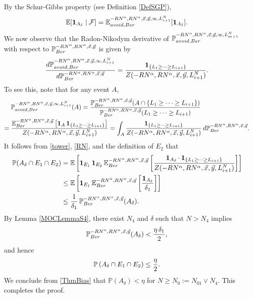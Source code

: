 	By the Schur-Gibbs property (see Definition \ref{DefSGP}),
	\[
	\mathbb{E}[\operatorname{\mathbf{1}}_{A_\delta}\mid \mathcal{F}]=\mathbb{E}_{avoid,Ber}^{-RN^\alpha,RN^\alpha,\vec x, \vec y, \infty, L_{i+1}^N}[\operatorname{\mathbf{1}}_{A_\delta}].
	\]
	We now observe that the Radon-Nikodym derivative of $\mathbb{P}_{avoid,Ber}^{-RN^\alpha,RN^\alpha,\vec x, \vec y, \infty, L_{m+1}^N}$ with respect to $\mathbb{P}_{Ber}^{-RN^\alpha, RN^\alpha,\vec x,\vec y}$ is given by 
	\begin{equation}
	\frac{d\mathbb{P}_{avoid,Ber}^{-RN^\alpha,RN^\alpha,\vec x, \vec y, \infty, L_{i+1}^N}}{d\mathbb{P}_{Ber}^{-RN^\alpha, RN^\alpha,\vec x,\vec y}} = \frac{\operatorname{\mathbf{1}}_{\left\{L_1 \geq \cdots \geq L_{i+1}\right\}}}{Z(-RN^\alpha,RN^\alpha,\vec x, \vec y, L_{i+1}^N)}. \label{RN}
	\end{equation}
	To see this, note that for any event $A$,
	\begin{align*}
	&\mathbb{P}_{avoid,Ber}^{-RN^\alpha,RN^\alpha,\vec x, \vec y, \infty, L_{i+1}^N}(A) = \frac{\mathbb{P}_{Ber}^{-RN^\alpha,RN^\alpha,\vec x, \vec y}(A\cap\left\{L_1 \geq \cdots \geq L_{i+1}\right\})}{\mathbb{P}_{Ber}^{-RN^\alpha,RN^\alpha,\vec x, \vec y}(L_1\geq\cdots\geq L_{i+1})}\\
	= \; & \frac{\mathbb{E}_{Ber}^{-RN^\alpha,RN^\alpha,\vec x, \vec y}\left[\operatorname{\mathbf{1}}_A \operatorname{\mathbf{1}}_{\left\{L_1\geq\cdots\geq L_{i+1}\right\}}\right]}{Z(-RN^\alpha,RN^\alpha,\vec{x},\vec{y},L^N_{i+1})} = \int_A \frac{\operatorname{\mathbf{1}}_{\left\{L_1\geq\cdots\geq L_{i+1}\right\}}}{Z(-RN^\alpha,RN^\alpha,\vec x, \vec y, L_{i+1}^N)}\,d\mathbb{P}_{Ber}^{-RN^\alpha,RN^\alpha,\vec x, \vec y}.
	\end{align*}
	It follows from \eqref{tower}, \eqref{RN}, and the definition of $E_2$ that
	\begin{align*}
	\mathbb{P}(A_\delta\cap E_1\cap E_2) &=\mathbb{E}\left[\operatorname{\mathbf{1}}_{E_1}\operatorname{\mathbf{1}}_{E_2} \mathbb{E}_{Ber}^{-RN^\alpha, RN^\alpha,\vec x,\vec y}\left[\frac{\operatorname{\mathbf{1}}_{A_\delta}\cdot \operatorname{\mathbf{1}}_{\left\{L_1\geq\cdots\geq L_{i+1}\right\}}}{Z(-RN^\alpha,RN^\alpha,\vec x, \vec y, L_{i+1}^N)}\right]\right]\\
	&\leq \mathbb{E}\left[\operatorname{\mathbf{1}}_{E_1}\mathbb{E}_{Ber}^{-RN^\alpha,RN^\alpha,\vec x,\vec y}\left[\frac{\operatorname{\mathbf{1}}_{A_\delta}}{\delta_1}\right]\right]\\
	&\leq \frac{1}{\delta_1}\,\mathbb{P}_{Ber}^{-RN^\alpha,RN^\alpha,\vec x,\vec y}(A_\delta).
	\end{align*}
	By Lemma \ref{MOCLemmaS4}, there exist $N_4$ and $\delta$ such that $N>N_4$ implies
	\[
	\mathbb{P}_{Ber}^{-RN^\alpha,RN^\alpha,\vec x,\vec y}(A_\delta)<\frac{\eta\,\delta_1}2,
	\] 
	and hence $$\mathbb{P}\left(A_\delta\cap E_1\cap E_2\right)\leq \frac{\eta}{2}.$$ We conclude from \eqref{ThmBias} that $\mathbb{P}(A_\delta) < \eta$ for $N\geq N_0 := N_{01} \vee N_4$. This completes the proof.

